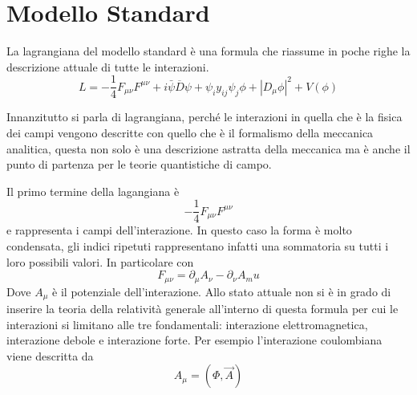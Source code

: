 \section{Modello Standard}
La lagrangiana del modello standard è una formula che riassume in poche righe la descrizione attuale di tutte le interazioni.
\begin{equation}
L=-\frac{1}{4}F_{\mu\nu}F^{\mu\nu}+i\bar{\psi}\overline{D}\psi+\psi_i y_{ij}\psi_j\phi+|D_\mu\phi|^2+V(\phi)
\end{equation}

Innanzitutto si parla di lagrangiana, perché le interazioni in quella che è la fisica dei campi vengono descritte con quello che è il formalismo della meccanica analitica, questa non solo è una descrizione astratta della meccanica ma è anche il punto di partenza per le teorie quantistiche di campo.

Il primo termine della lagangiana è 
\begin{equation}
-\frac{1}{4}F_{\mu\nu}F^{\mu\nu}
\end{equation}
e rappresenta i campi dell'interazione.
In questo caso la forma è molto condensata, gli indici ripetuti rappresentano infatti una sommatoria su tutti i loro possibili valori.
In particolare con
\begin{equation}
F_{\mu \nu}=\partial_\mu A_\nu-\partial_\nu A_mu
\end{equation}
Dove $A_\mu$ è il potenziale dell'interazione.
Allo stato attuale non si è in grado di inserire la teoria della relatività generale all'interno di questa formula per cui le interazioni si limitano alle tre fondamentali: interazione elettromagnetica, interazione debole e interazione forte. 
Per esempio l'interazione coulombiana viene descritta da
\begin{equation}
A_\mu=(\Phi, \vec{A})
\end{equation}

